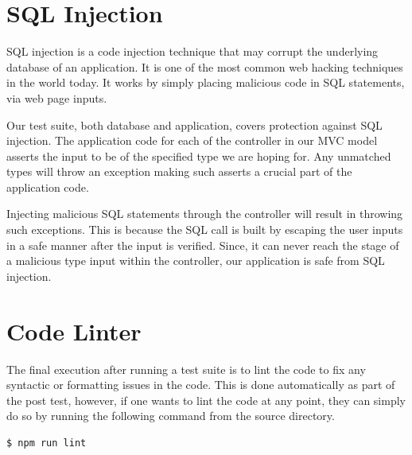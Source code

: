 \documentclass[fontsize=12pt,paper=letter,twoside]{scrartcl}
\begin{document}
\newpage
\section{SQL Injection}
SQL injection is a code injection technique that may corrupt the underlying database of an application. It is one of the most common web hacking techniques in the world today. It works by simply placing malicious code in SQL statements, via web page inputs.

\bigskip
\noindent Our test suite, both database and application, covers protection against SQL injection. The application code for each of the controller in our MVC model asserts the input to be of the specified type we are hoping for. Any unmatched types will throw an exception making such asserts a crucial part of the application code.

\bigskip
\noindent Injecting malicious SQL statements through the controller will result in throwing such exceptions. This is because the SQL call is built by escaping the user inputs in a safe manner after the input is verified. Since, it can never reach the stage of a malicious type input within the controller, our application is safe from SQL injection.


\section{Code Linter}
The final execution after running a test suite is to lint the code to fix any syntactic or formatting issues in the code. This is done automatically as part of the post test, however, if one wants to lint the code at any point, they can simply do so by running the following command from the source directory.

\begin{lstlisting}[language=bash]
	$ npm run lint
\end{lstlisting}
\end{document}

